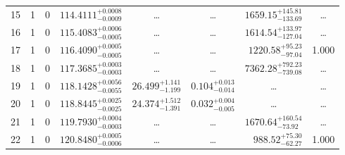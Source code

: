 \begin{table*}[!]
\begin{tabular}{llcrrlrc}
15 & 1 & 0 & $    114.4111_{-      0.0009}^{+      0.0008}$ & \multicolumn{1}{c}{\dots} & \multicolumn{1}{c}{\dots} & $     1659.15_{-      133.69}^{+      145.81}$ & \dots \\[1pt]
16 & 1 & 0 & $    115.4083_{-      0.0005}^{+      0.0006}$ & \multicolumn{1}{c}{\dots} & \multicolumn{1}{c}{\dots} & $     1614.54_{-      127.04}^{+      133.97}$ & \dots \\[1pt]
17 & 1 & 0 & $    116.4090_{-      0.0005}^{+      0.0005}$ & \multicolumn{1}{c}{\dots} & \multicolumn{1}{c}{\dots} & $     1220.58_{-       97.04}^{+       95.23}$ & 1.000 \\[1pt]
18 & 1 & 0 & $    117.3685_{-      0.0003}^{+      0.0003}$ & \multicolumn{1}{c}{\dots} & \multicolumn{1}{c}{\dots} & $     7362.28_{-      739.08}^{+      792.23}$ & \dots \\[1pt]
19 & 1 & 0 & $    118.1428_{-      0.0055}^{+      0.0056}$ & $      26.499_{-       1.199}^{+       1.141}$ & $       0.104_{-       0.014}^{+       0.013}$ & \multicolumn{1}{c}{\dots} & \dots \\[1pt]
20 & 1 & 0 & $    118.8445_{-      0.0025}^{+      0.0025}$ & $      24.374_{-       1.391}^{+       1.512}$ & $       0.032_{-       0.005}^{+       0.004}$ & \multicolumn{1}{c}{\dots} & \dots \\[1pt]
21 & 1 & 0 & $    119.7930_{-      0.0003}^{+      0.0004}$ & \multicolumn{1}{c}{\dots} & \multicolumn{1}{c}{\dots} & $     1670.64_{-       73.92}^{+      160.54}$ & \dots \\[1pt]
22 & 1 & 0 & $    120.8480_{-      0.0006}^{+      0.0005}$ & \multicolumn{1}{c}{\dots} & \multicolumn{1}{c}{\dots} & $      988.52_{-       62.27}^{+       75.30}$ & 1.000 \\[1pt]


\end{tabular}
\end{table*}
